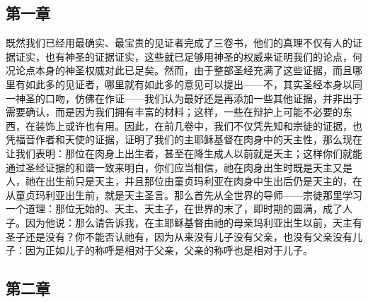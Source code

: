 \subsection{第一章}

\par

既然我们已经用最确实、最宝贵的见证者完成了三卷书，他们的真理不仅有人的证据证实，也有神圣的证据证实，这些就已足够用神圣的权威来证明我们的论点，何况论点本身的神圣权威对此已足矣。然而，由于整部圣经充满了这些证据，而且哪里有如此多的见证者，哪里就有如此多的意见可以提出——不，其实圣经本身以同一神圣的口吻，仿佛在作证——我们认为最好还是再添加一些其他证据，并非出于需要确认，而是因为我们拥有丰富的材料；这样，一些在辩护上可能不必要的东西，在装饰上或许也有用。因此，在前几卷中，我们不仅凭先知和宗徒的证据，也凭福音作者和天使的证据，证明了我们的主耶稣基督在肉身中的天主性，那么现在让我们表明：那位在肉身上出生者，甚至在降生成人以前就是天主；这样你们就能通过圣经证据的和谐一致来明白，你们应当相信，祂在肉身出生时既是天主又是人，祂在出生前只是天主，并且那位由童贞玛利亚在肉身中生出后仍是天主的，在从童贞玛利亚出生前，就是天主圣言。那么首先从全世界的导师——宗徒那里学习一个道理：那位无始的、天主、天主子，在世界的末了，即时期的圆满，成了人子。因为他说：那么请告诉我，在主耶稣基督由祂的母亲玛利亚出生以前，天主有圣子还是没有？你不能否认祂有，因为从来没有儿子没有父亲，也没有父亲没有儿子：因为正如儿子的称呼是相对于父亲，父亲的称呼也是相对于儿子。\par


\subsection{第二章}

\par

